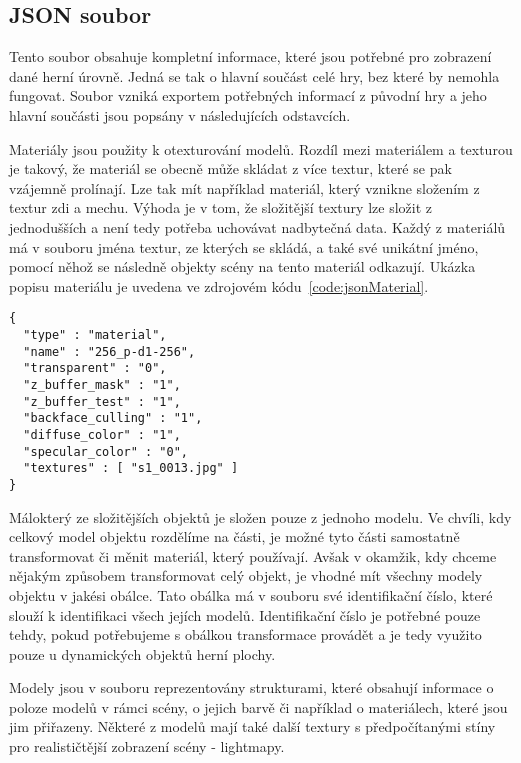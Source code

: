 \subsection*{JSON soubor}
\label{subsection:navrhJSON}
Tento soubor obsahuje kompletní informace, které jsou potřebné pro zobrazení dané herní úrovně. Jedná se tak o hlavní součást celé hry, bez které by nemohla fungovat. Soubor vzniká exportem potřebných informací z původní hry a jeho hlavní součásti jsou popsány v následujících odstavcích.

Materiály jsou použity k otexturování modelů. Rozdíl mezi materiálem a texturou je takový, že materiál se obecně může skládat z více textur, které se pak vzájemně prolínají. Lze tak mít například materiál, který vznikne složením z textur zdi a mechu. Výhoda je v tom, že složitější textury lze složit z jednodušších a není tedy potřeba uchovávat nadbytečná data. Každý z materiálů má v souboru jména textur, ze kterých se skládá, a také své unikátní jméno, pomocí něhož se následně objekty scény na tento materiál odkazují. Ukázka popisu materiálu je uvedena ve zdrojovém kódu~\ref{code:jsonMaterial}.

\begin{lstlisting}[caption=Objekt \texttt{material} vstupního souboru JSON,label=code:jsonMaterial]
{
  "type" : "material",
  "name" : "256_p-d1-256",
  "transparent" : "0",
  "z_buffer_mask" : "1",
  "z_buffer_test" : "1",
  "backface_culling" : "1",
  "diffuse_color" : "1",
  "specular_color" : "0",
  "textures" : [ "s1_0013.jpg" ]
}
\end{lstlisting}

Málokterý ze složitějších objektů je složen pouze z jednoho modelu. Ve chvíli, kdy celkový model objektu rozdělíme na části, je možné tyto části samostatně transformovat či měnit materiál, který používají. Avšak v okamžik, kdy chceme nějakým způsobem transformovat celý objekt, je vhodné mít všechny modely objektu v jakési obálce. Tato obálka má v souboru své identifikační číslo, které slouží k identifikaci všech jejích modelů. Identifikační číslo je potřebné pouze tehdy, pokud potřebujeme s obálkou transformace provádět a je tedy využito pouze u dynamických objektů herní plochy.

Modely jsou v souboru reprezentovány strukturami, které obsahují informace o poloze modelů v rámci scény, o jejich barvě či například o materiálech, které jsou jim přiřazeny. Některé z modelů mají také další textury s předpočítanými stíny pro realističtější zobrazení scény - lightmapy. 


